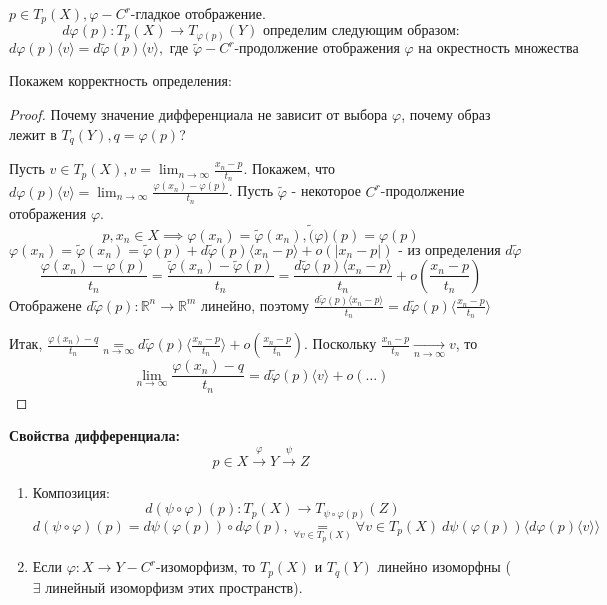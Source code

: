 \begin{definition}
    $p \in T_p(X), \varphi - C^r$-гладкое отображение. 
    \[d\varphi(p): T_p(X) \to T_{\varphi(p)}(Y) \text{ определим следующим образом:}\]
    \[d\varphi(p)\langle v \rangle = d\tilde{\varphi}(p) \langle v \rangle, \text{ где }\tilde{\varphi} - C^r\text{-продолжение отображения $\varphi$ на окрестность множества }\] 
    \par
    Покажем корректность определения:
    \par
    \begin{proof}
        
        Почему значение дифференциала не зависит от выбора $\varphi$, почему образ лежит в $T_q(Y), q = \varphi(p)$? \par
        
        Пусть $v \in T_p(X), v = \lim_{n \to \infty} \frac{x_n - p}{t_n}$. Покажем, что $d\varphi(p)\langle v \rangle = \lim_{n \to \infty} \frac{\varphi(x_n) - \varphi(p)}{t_n}$. Пусть $\tilde{\varphi}$ - некоторое $C^r$-продолжение отображения $\varphi$. 
        \[p, x_n \in X \implies \varphi(x_n) = \tilde{\varphi}(x_n), \tilde(\varphi)(p) = \varphi(p)\]    
        \[\varphi(x_n) = \tilde{\varphi}(x_n) = \tilde{\varphi}(p) + d\tilde{\varphi}(p)\langle x_n - p \rangle + o(\left| x_n - p \right|) \text{ - из определения } d\tilde{\varphi}\]
        \[\frac{\varphi(x_n) - \varphi(p)}{t_n} = \frac{\tilde{\varphi}(x_n) - \tilde{\varphi}(p)}{t_n} = \frac{d\tilde{\varphi}(p)\langle x_n - p \rangle}{t_n} + o(\frac{x_n - p}{t_n})\]
        Отображене $d\tilde{\varphi}(p):\mathbb{R}^n \to \mathbb{R}^m$ линейно, поэтому $\frac{d\tilde{\varphi}(p)\langle x_n - p \rangle}{t_n} = d\tilde{\varphi}(p)\langle \frac{x_n - p}{t_n} \rangle$
        \par
        Итак, $\frac{\varphi(x_n) - q}{t_n} \underset{n \to \infty}{=} d\tilde{\varphi}(p)\langle \frac{x_n - p}{t_n} \rangle + o(\frac{x_n - p}{t_n})$. Поскольку $\frac{x_n - p}{t_n} \underset{n \to \infty}{\to} v$, то 
        \[\lim_{n \to \infty} \frac{\varphi(x_n) - q}{t_n} = d\tilde{\varphi}(p)\langle v \rangle + o(\hdots)\]
    \end{proof}
\end{definition}

\textbf{Свойства дифференциала:}
\[p \in X \overset{\varphi}{\to} Y \overset{\psi}{\to} Z\]
\begin{enumerate}
    \item Композиция: \[d(\psi \circ \varphi)(p): T_p(X) \to T_{\psi \circ \varphi(p)}(Z)\]
    \[d(\psi \circ \varphi)(p) = d\psi(\varphi(p))\circ d\varphi(p), \underset{\forall v \in T_p(X)}{=} \forall v \in T_p(X) \ d\psi(\varphi(p))\langle d\varphi(p)\langle v \rangle \rangle\]
    \item Если $\varphi: X \to Y - C^r$-изоморфизм, то $T_p(X)$ и $T_q(Y)$ линейно изоморфны ($\exists$ линейный изоморфизм этих пространств).
\end{enumerate}

